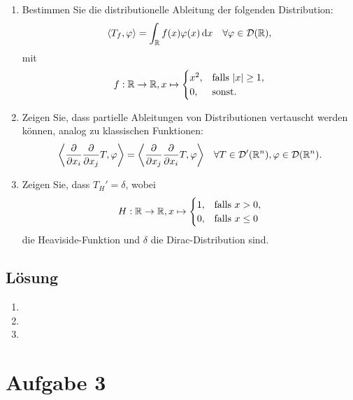 \documentclass{exercise}
\begin{document}
    \begin{problem}
        \begin{enumerate}
            \item Bestimmen Sie die distributionelle Ableitung der folgenden Distribution:
            \[
                \angles*{T_f, \varphi} = \int_\R f\parentheses*{x}\varphi\parentheses*{x}\d x \quad \forall\varphi \in \mathcal{D}\parentheses*{\R},
            \]
            mit
            \[
                f: \R \to \R, x \mapsto \begin{cases}
                    x^2, & \text{falls }\absolute*{x} \ge 1,\\
                    0, & \text{sonst}.
                \end{cases}
            \]
            \item Zeigen Sie, dass partielle Ableitungen von Distributionen vertauscht werden können, analog zu klassischen Funktionen:
            \[
                \angles*{\frac{\partial}{\partial x_i}\frac{\partial}{\partial x_j}T, \varphi} = \angles*{\frac{\partial}{\partial x_j}\frac{\partial}{\partial x_i}T, \varphi} \quad \forall T \in \mathcal{D}'\parentheses*{\R^n}, \varphi \in \mathcal{D}\parentheses*{\R^n}.
            \]
            \item Zeigen Sie, dass \(T_H' = \delta\), wobei
            \[
                H: \mathbb{R} \to \mathbb{R}, x \mapsto \begin{cases}
                    1, & \text{falls }x > 0,\\
                    0, & \text{falls }x \le 0
                \end{cases}
            \]
            die Heaviside-Funktion und \(\delta\) die Dirac-Distribution sind.
        \end{enumerate}
    \end{problem}

    \subsection*{Lösung}
    \begin{enumerate}
        \item
        \item
        \item
    \end{enumerate}


    \section*{Aufgabe 3}
\end{document}
